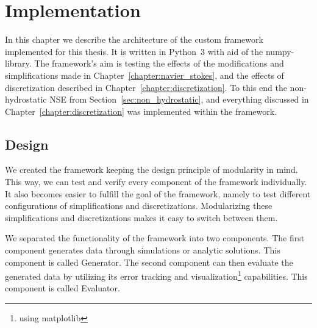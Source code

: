 
\chapter{Implementation}\label{chapter:implementation}
In this chapter we describe the architecture of the custom framework implemented for this thesis.
It is written in Python~3 with aid of the numpy-library.
The framework's aim is testing the effects of the modifications and simplifications made in Chapter~\ref{chapter:navier_stokes}, and the effects of discretization described in Chapter~\ref{chapter:discretization}.
To this end the non-hydrostatic NSE from Section~\ref{sec:non_hydrostatic}, and everything discussed in Chapter~\ref{chapter:discretization} was implemented within the framework.


\section{Design}
We created the framework keeping the design principle of modularity in mind.
This way, we can test and verify every component of the framework individually.
It also becomes easier to fulfill the goal of the framework, namely to test different configurations of simplifications and discretizations.
Modularizing these simplifications and discretizations makes it easy to switch between them.

We separated the functionality of the framework into two components.
The first component generates data through simulations or analytic solutions.
This component is called Generator.
The second component can then evaluate the generated data by utilizing its error tracking and visualization\footnote{using matplotlib} capabilities.
This component is called Evaluator.

